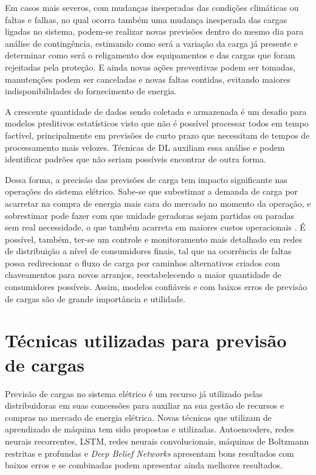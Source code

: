 \documentclass[
	12pt,				%
	oneside,			%
	a4paper,			%
	english,			%
	brazil				%
	]{abntex2}
\begin{document}
	Em casos mais severos,  com mudanças inesperadas das condições climáticas ou faltas e falhas, no qual ocorra também uma mudança inesperada das cargas ligadas no sistema, podem-se realizar novas previsões dentro do mesmo dia para análise de contingência, estimando como será a variação da carga já presente e determinar como será o religamento dos equipamentos e das cargas que foram rejeitadas pela proteção. E ainda novas ações preventivas podem ser tomadas, manutenções podem ser canceladas e novas faltas contidas, evitando maiores indisponibilidades do fornecimento de energia. 
	
	A crescente quantidade de dados sendo coletada e armazenada é um desafio para modelos preditivos estatísticos visto que não é possível processar todos em tempo factível, principalmente em previsões de curto prazo que necessitam de tempos de processamento mais velozes. Técnicas de DL auxiliam essa análise e podem identificar padrões que não seriam possíveis encontrar de outra forma. 
	

	Dessa forma, a precisão das previsões de carga tem impacto significante nas operações do sistema elétrico. Sabe-se que subestimar a demanda de carga por acarretar na compra de energia mais cara do mercado no momento da operação, e sobrestimar pode fazer com que unidade geradoras sejam partidas ou paradas sem real necessidade, o que também acarreta em maiores custos operacionais \cite{choueiki1997building}. É possível, também, ter-se um controle e monitoramento mais detalhado em redes de distribuição a nível de consumidores finais, tal que na ocorrência de faltas possa redirecionar o fluxo de carga por caminhos alternativos criados com chaveamentos para novos arranjos, reestabelecendo a maior quantidade de consumidores possíveis. Assim, modelos confiáveis e com baixos erros de previsão de cargas são de grande importância e utilidade.	
	
	\section{Técnicas utilizadas para previsão de cargas}

	Previsão de cargas no sistema elétrico é um recurso já utilizado pelas distribuidoras em suas concessões para auxiliar na sua gestão de recursos e compras no mercado de energia elétrica. Novas técnicas que utilizam de aprendizado de máquina tem sido propostas e utilizadas. Autoencoders, redes neurais recorrentes, LSTM, redes neurais convolucionais, máquinas de Boltzmann restritas e profundas e \textit{Deep Belief Networks} apresentam bons resultados com baixos erros e se combinadas podem apresentar ainda melhores resultados. \cite{almalaq2017review} 
	
\end{document}
